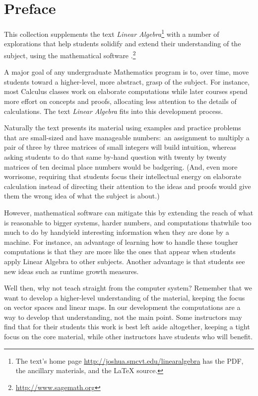 \chapter*{Preface}\pagestyle{preface}\thispagestyle{preface}


This collection supplements the text \nocite{Hefferon12}
\textit{Linear Algebra}\footnote{The text's home page 
\protect\url{http://joshua.smcvt.edu/linearalgebra} 
has the PDF, the ancillary materials, and the \protect\LaTeX{} source.}
with a number of explorations that help students
solidify and extend their understanding of the subject, 
using the mathematical software \Sage{}.\footnote{\url{http://www.sagemath.org}}

A major goal of any undergraduate Mathematics program is to,
over time, move students 
toward a higher-level, more abstract, grasp of the subject.
For instance, most Calculus classes work on elaborate computations
while later courses spend more effort on concepts and proofs, allocating 
less attention to the details of calculations.  
The text \textit{Linear Algebra} fits into
this development process.

Naturally the text presents its material 
using examples and practice problems
that are small-sized and have manageable numbers:~an 
assignment to multiply a pair of three by three matrices
of small integers will build intuition, whereas asking students to do that same 
by-hand question with twenty by twenty matrices
of ten decimal place numbers would be badgering. 
(And, even more worrisome, requiring that students  
focus their intellectual energy on elaborate calculation instead of directing
their attention to the ideas and proofs would give them the wrong idea of
what the subject is about.)

However, mathematical software can mitigate this by extending the reach of
what is reasonable
to bigger systems, harder numbers, and computations 
that\Dash while too much to do by hand\Dash yield
interesting information when they are done by a machine.
For instance, an advantage of learning how to handle these 
tougher computations is that 
they are more like the ones that appear when students apply Linear 
Algebra to other subjects.
Another advantage is that students see new ideas such as 
runtime growth measures.

Well then, why 
not teach straight from the computer system?
Remember that we want to develop a higher-level understanding of the 
material, 
keeping the focus on vector spaces and linear maps.
In our development 
the computations are a way to develop that understanding, not the main point.
Some instructors may find 
that for their students
this work is best left aside altogether, keeping a tight focus on the
core material, while other instructors
have students who will benefit.


